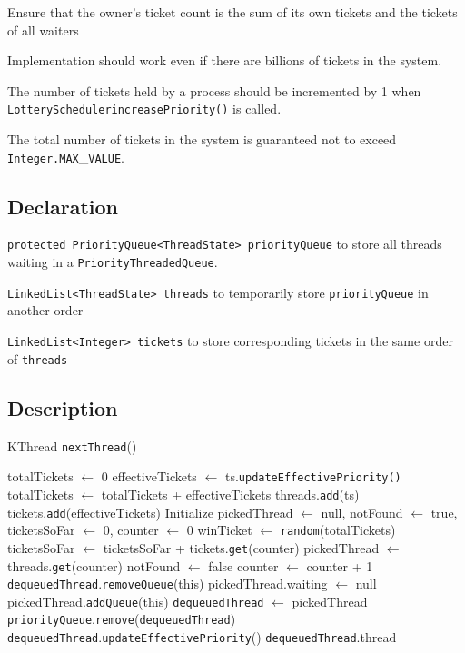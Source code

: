 \documentclass{article}
\begin{document}
\begin{spacing}{1.1}
\begin{asparaitem}
\item Ensure that the owner's ticket count is the sum of its own tickets and the tickets of all waiters
\item Implementation should work even if there are billions of tickets in the system.
\item The number of tickets held by a process should be incremented by 1 when \texttt{LotterySchedulerincreasePriority()} is called.
\item The total number of tickets in the system is guaranteed not to exceed \texttt{Integer.MAX}\_\texttt{VALUE}.
\end{asparaitem}

\subsection{Declaration}

\texttt{protected PriorityQueue<ThreadState> priorityQueue} to store all threads waiting in a \texttt{PriorityThreadedQueue}.

\texttt{LinkedList<ThreadState> threads} to temporarily store \texttt{priorityQueue} in another order

\texttt{LinkedList<Integer> tickets} to store corresponding tickets in the same order of \texttt{threads}

\subsection{Description}

\begin{algorithm}
  \caption{KThread \texttt{nextThread}()}
\begin{algorithmic}[1]
  \STATE totalTickets $\leftarrow$ 0
    \STATE effectiveTickets $\leftarrow$ ts.\texttt{updateEffectivePriority()}
    \STATE totalTickets $\leftarrow$ totalTickets + effectiveTickets
    \STATE threads.\texttt{add}(ts)
    \STATE tickets.\texttt{add}(effectiveTickets)
  \ENDFOR
  \STATE Initialize pickedThread $\leftarrow$ null, notFound $\leftarrow$ true, ticketsSoFar $\leftarrow$ 0, counter $\leftarrow$ 0
  \STATE winTicket $\leftarrow$ \texttt{random}(totalTickets)
    \STATE ticketsSoFar $\leftarrow$ ticketsSoFar + tickets.\texttt{get}(counter)
      \STATE pickedThread $\leftarrow$ threads.\texttt{get}(counter)
      \STATE notFound $\leftarrow$ false
    \ENDIF
    \STATE counter $\leftarrow$ counter + 1
  \ENDWHILE
  \STATE \texttt{dequeuedThread}.\texttt{removeQueue}(this)
  \STATE pickedThread.waiting $\leftarrow$ null
  \STATE pickedThread.\texttt{addQueue}(this)
  \STATE \texttt{dequeuedThread} $\leftarrow$ pickedThread
  \STATE \texttt{priorityQueue}.\texttt{remove}(\texttt{dequeuedThread})
  \STATE \texttt{dequeuedThread}.\texttt{updateEffectivePriority}()
  \RETURN \texttt{dequeuedThread}.thread
\end{algorithmic}
\end{algorithm}


\end{spacing}
\end{document}
